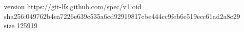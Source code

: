 version https://git-lfs.github.com/spec/v1
oid sha256:049762b4ea7226e639c535a6cd92919817cbe444cc9feb6e519ecc61ad2a8c29
size 125919
